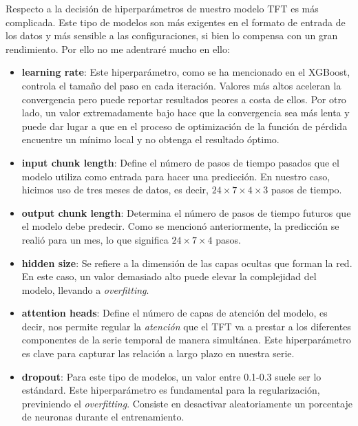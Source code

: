 %
%
%
Respecto a la decisión de hiperparámetros de nuestro modelo TFT es más complicada. Este tipo de modelos son más exigentes en el formato de entrada de los datos y más sensible a las configuraciones, si bien lo compensa con un gran rendimiento. Por ello no me adentraré mucho en ello:
\begin{itemize}
    \item \textbf{learning rate}: Este hiperparámetro, como se ha mencionado en el XGBoost, controla el tamaño del paso en cada iteración. Valores más altos aceleran la convergencia pero puede reportar resultados peores a costa de ellos. Por otro lado, un valor extremadamente bajo hace que la convergencia sea más lenta y puede dar lugar a que en el proceso de optimización de la función de pérdida encuentre un mínimo local y no obtenga el resultado óptimo.
    
    \item \textbf{input chunk length}: Define el número de pasos de tiempo pasados que el modelo utiliza como entrada para hacer una predicción. En nuestro caso, hicimos uso de tres meses de datos, es decir, $24 \times 7 \times 4 \times 3$ pasos de tiempo.
    \item \textbf{output chunk length}: Determina el número de pasos de tiempo futuros que el modelo debe predecir. Como se mencionó anteriormente, la predicción se realió para un mes, lo que significa $24 \times 7 \times 4$ pasos.
     
    \item \textbf{hidden size}: Se refiere a la dimensión de las capas ocultas que forman la red. En este caso, un valor demasiado alto puede elevar la complejidad del modelo, llevando a \textit{overfitting}.
     
    \item \textbf{attention heads}: Define el número de capas de atención del modelo, es decir, nos permite regular la \textit{atención} que el TFT va a prestar a los diferentes componentes de la serie temporal de manera simultánea. Este hiperparámetro es clave para capturar las relación a largo plazo en nuestra serie.
     
    \item \textbf{dropout}: Para este tipo de modelos, un valor entre 0.1-0.3 suele ser lo estándard. Este hiperparámetro es fundamental para la regularización, previniendo el \textit{overfitting}. Consiste en desactivar aleatoriamente un porcentaje de neuronas durante el entrenamiento.
\end{itemize}

